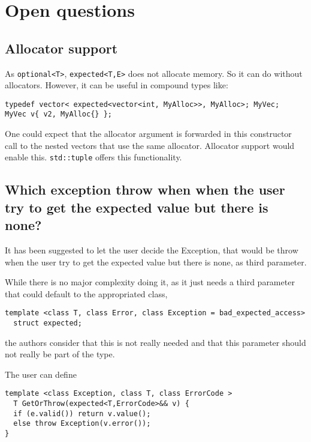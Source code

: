 \documentclass[a4paper,10pt]{article}
\newcommand{\cpp}[1]{\lstinline{#1}}
\begin{document}
\section{Open questions}

\subsection{Allocator support}

As \cpp{optional<T>},  \cpp{expected<T,E>} does not allocate memory. So it can do without allocators. However, it can be useful in compound types like:

\begin{lstlisting}
typedef vector< expected<vector<int, MyAlloc>>, MyAlloc>; MyVec;
MyVec v{ v2, MyAlloc{} };
\end{lstlisting}

One could expect that the allocator argument is forwarded in this constructor call to the nested vectors that use the same allocator. Allocator support would enable this. \cpp{std::tuple} offers this functionality.

\subsection{Which exception throw when when the user try to get the expected value but there is none?}

It has been suggested to let the user decide the Exception, that would be throw when the user try to get the expected value but there is none, as third parameter. 

While there is no major complexity doing it, as it just needs a third parameter that could default to the appropriated class, 

\begin{lstlisting}
template <class T, class Error, class Exception = bad_expected_access>
  struct expected;
\end{lstlisting}

the authors consider that this is not really needed and that this parameter should not really be part of the type.

The user can define

\begin{lstlisting}
template <class Exception, class T, class ErrorCode >
  T GetOrThrow(expected<T,ErrorCode>&& v) {
  if (e.valid()) return v.value();
  else throw Exception(v.error());
}
\end{lstlisting}
\end{document}
